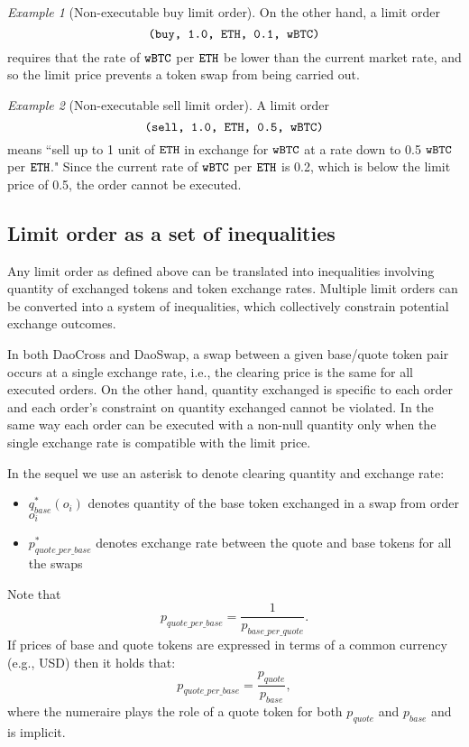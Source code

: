 \documentclass[11pt, reqno]{amsart}
\theoremstyle{definition}
\theoremstyle{remark}
\newtheorem{exmp}{Example}[subsection]
\newcommand{\BTC}{\textnormal{\texttt{wBTC}}}
\newcommand{\ETH}{\textnormal{\texttt{ETH}}}
\newcommand{\buy}{\textnormal{\texttt{buy}}}
\newcommand{\sell}{\textnormal{\texttt{sell}}}
\begin{document}
\begin{exmp}[Non-executable buy limit order]
On the other hand, a limit order
\[
    \texttt{(\buy, 1.0, $\ETH$, 0.1, $\BTC$)}
\]
requires that the rate of $\BTC$ per $\ETH$ be lower than the current market
rate, and so the limit price prevents a token swap from being carried out.
\end{exmp}

\begin{exmp}[Non-executable sell limit order]
A limit order
\[
    \texttt{(\sell, 1.0, $\ETH$, 0.5, $\BTC$)}
\]
means
``sell up to 1 unit of $\ETH$ in exchange for $\BTC$ at a rate down to 0.5 $\BTC$ per $\ETH$."
Since the current rate of $\BTC$ per $\ETH$ is 0.2, which is below the limit
price of 0.5, the order cannot be executed.
\end{exmp}

\subsection{Limit order as a set of inequalities}
Any limit order as defined above can be translated into inequalities involving
quantity of exchanged tokens and token exchange rates. Multiple limit orders
can be converted into a system of inequalities, which collectively constrain
potential exchange outcomes.

In both DaoCross and DaoSwap, a swap between a given base/quote token pair
occurs at a single exchange rate, i.e., the clearing price is the same for
all executed orders. On the other hand, quantity exchanged is specific to
each order and each order's constraint on quantity exchanged cannot be
violated. In the same way each order can be executed with a non-null quantity
only when the single exchange rate is compatible with the limit price.

In the sequel we use an asterisk to denote clearing quantity and exchange
rate:
\begin{itemize}
	\item $q_{base}^*(o_i)$ denotes quantity of the base token exchanged in a
	      swap from order $o_i$
	\item $p_{quote\_per\_base}^*$ denotes exchange rate between the quote
		  and base tokens for all the swaps
\end{itemize}
Note that
\[
	p_{quote\_per\_base} = 
	\frac{1}{p_{base\_per\_quote}}.
\]
If prices of base and quote tokens are expressed in terms of a common currency
(e.g., USD) then it holds that:
\[
	p_{quote\_per\_base} = \frac{p_{quote}}{p_{base}},
\]
where the numeraire plays the role of a quote token for both
$p_{quote}$ and $p_{base}$ and is implicit.
\end{document}
